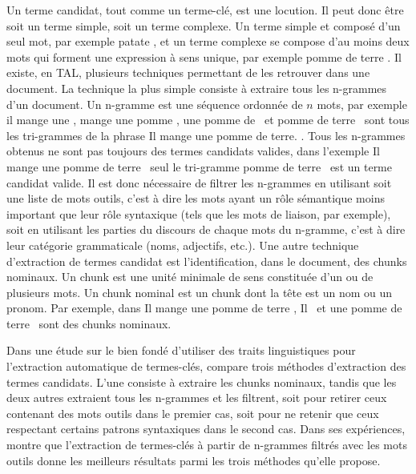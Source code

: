     Un terme candidat, tout comme un terme-clé, est une locution. Il peut donc
    être soit un terme simple, soit un terme complexe. Un terme simple et composé
    d'un seul mot, par exemple \og patate \fg, et un terme complexe se compose
    d'au moins deux mots qui forment une expression à sens unique, par exemple
    \og pomme de terre \fg. Il existe, en TAL, plusieurs techniques permettant de
    les retrouver dans une document. La technique la plus simple consiste à
    extraire tous les n-grammes d'un document. Un n-gramme est une séquence
    ordonnée de $n$ mots, par exemple \og il mange une \fg, \og mange une
    pomme \fg, \og une pomme de \fg\ et \og pomme de terre \fg\ sont
    tous les tri-grammes de la phrase \og Il mange une pomme de terre. \fg. Tous
    les n-grammes obtenus ne sont pas toujours des termes candidats valides, dans
    l'exemple \og Il mange une pomme de terre \fg\ seul le tri-gramme \og pomme de
    terre \fg\ est un terme candidat valide. Il est donc nécessaire de filtrer les
    n-grammes en utilisant soit une liste de mots outils, c'est à dire les mots
    ayant un rôle sémantique moins important que leur rôle syntaxique (tels que
    les mots de liaison, par exemple), soit en utilisant les parties du discours
    de chaque mots du n-gramme, c'est à dire leur catégorie grammaticale (noms,
    adjectifs, etc.). Une autre technique d'extraction de termes candidat est
    l'identification, dans le document, des chunks nominaux. Un chunk est une
    unité minimale de sens constituée d'un ou de plusieurs mots. Un chunk nominal
    est un chunk dont la tête est un nom ou un pronom. Par exemple, dans \og Il
    mange une pomme de terre \fg, \og Il \fg\ et \og une pomme de terre \fg\ sont
    des chunks nominaux.
    
    Dans une étude sur le bien fondé d'utiliser des traits linguistiques pour
    l'extraction automatique de termes-clés, \citet{hulth2003keywordextraction}
    compare trois méthodes d'extraction des termes candidats. L'une consiste à
    extraire les chunks nominaux, tandis que les deux autres
    extraient tous les n-grammes et les filtrent, soit pour retirer ceux contenant
    des mots outils dans le premier cas, soit pour ne retenir que ceux respectant
    certains patrons syntaxiques dans le second cas. Dans ses expériences,
    \citet{hulth2003keywordextraction} montre que l'extraction de termes-clés à
    partir de n-grammes filtrés avec les mots outils donne les meilleurs résultats
    parmi les trois méthodes qu'elle propose.

